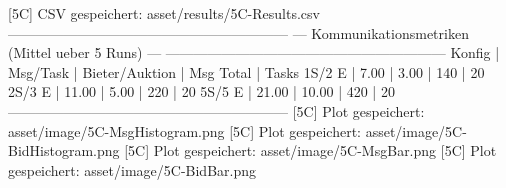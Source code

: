 [5C]      CSV gespeichert: asset/results/5C-Results.csv
------------------------------------------------------------
--- Kommunikationsmetriken (Mittel ueber 5 Runs) ---
------------------------------------------------------------
Konfig   | Msg/Task | Bieter/Auktion | Msg Total | Tasks
   1S/2  E |     7.00 |           3.00 |       140 |    20
   2S/3  E |    11.00 |           5.00 |       220 |    20
   5S/5  E |    21.00 |          10.00 |       420 |    20
------------------------------------------------------------
[5C]      Plot gespeichert: asset/image/5C-MsgHistogram.png
[5C]      Plot gespeichert: asset/image/5C-BidHistogram.png
[5C]      Plot gespeichert: asset/image/5C-MsgBar.png
[5C]      Plot gespeichert: asset/image/5C-BidBar.png